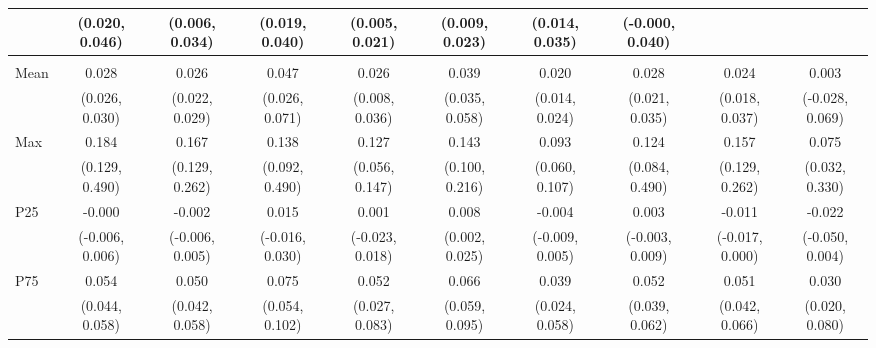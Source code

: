 {\begin{tabular}{l|c|c|c|c|c|c|c|c|c}
& {\scriptsize (0.020, 0.046)}
& {\scriptsize (0.006, 0.034)}
& {\scriptsize (0.019, 0.040)}
& {\scriptsize (0.005, 0.021)}
& {\scriptsize (0.009, 0.023)}
& {\scriptsize (0.014, 0.035)}
& {\scriptsize (-0.000, 0.040)}
\\ [0.1cm]
\hline
\noalign{\smallskip}
\multicolumn{10}{l}{\textbf{Effect with Leads and Lags}} \\
\noalign{\smallskip}
\hline
Mean
& 0.028 & 0.026 & 0.047 & 0.026 & 0.039 & 0.020 & 0.028 & 0.024 & 0.003 \\
& {\scriptsize (0.026, 0.030)}
& {\scriptsize (0.022, 0.029)}
& {\scriptsize (0.026, 0.071)}
& {\scriptsize (0.008, 0.036)}
& {\scriptsize (0.035, 0.058)}
& {\scriptsize (0.014, 0.024)}
& {\scriptsize (0.021, 0.035)}
& {\scriptsize (0.018, 0.037)}
& {\scriptsize (-0.028, 0.069)}
\\ [0.1cm]
\hline
Max
& 0.184 & 0.167 & 0.138 & 0.127 & 0.143 & 0.093 & 0.124 & 0.157 & 0.075 \\
& {\scriptsize (0.129, 0.490)}
& {\scriptsize (0.129, 0.262)}
& {\scriptsize (0.092, 0.490)}
& {\scriptsize (0.056, 0.147)}
& {\scriptsize (0.100, 0.216)}
& {\scriptsize (0.060, 0.107)}
& {\scriptsize (0.084, 0.490)}
& {\scriptsize (0.129, 0.262)}
& {\scriptsize (0.032, 0.330)}
\\ [0.1cm]
\hline
P25
& -0.000 & -0.002 & 0.015 & 0.001 & 0.008 & -0.004 & 0.003 & -0.011 & -0.022 \\
& {\scriptsize (-0.006, 0.006)}
& {\scriptsize (-0.006, 0.005)}
& {\scriptsize (-0.016, 0.030)}
& {\scriptsize (-0.023, 0.018)}
& {\scriptsize (0.002, 0.025)}
& {\scriptsize (-0.009, 0.005)}
& {\scriptsize (-0.003, 0.009)}
& {\scriptsize (-0.017, 0.000)}
& {\scriptsize (-0.050, 0.004)}
\\ [0.1cm]
\hline
P75
& 0.054 & 0.050 & 0.075 & 0.052 & 0.066 & 0.039 & 0.052 & 0.051 & 0.030 \\
& {\scriptsize (0.044, 0.058)}
& {\scriptsize (0.042, 0.058)}
& {\scriptsize (0.054, 0.102)}
& {\scriptsize (0.027, 0.083)}
& {\scriptsize (0.059, 0.095)}
& {\scriptsize (0.024, 0.058)}
& {\scriptsize (0.039, 0.062)}
& {\scriptsize (0.042, 0.066)}
& {\scriptsize (0.020, 0.080)}
\\ [0.1cm]
\hline
\hline
\end{tabular}
}
